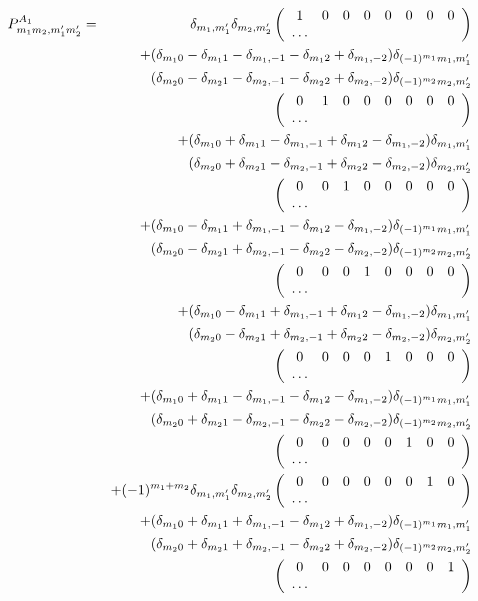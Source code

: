 \begin{eqnarray}\label{P3}
P^{A_1}_{m_1m_2,m'_1m'_2}&=&\delta_{m_1,m'_1}\delta_{m_2,m'_2}
\left (
\begin{array}{ccccccccc}
1 & 0 & 0 & 0 & 0 & 0 & 0 & 0\\
\dots 
\end{array} \right )\\ \nonumber
&&+(\delta_{m_10}-\delta_{m_11}-\delta_{m_1,-1}-\delta_{m_12}+\delta_{m_1,-2})
\delta_{(-1)^{m_1}m_1,m'_1}\\ \nonumber
&&(\delta_{m_20}-\delta_{m_21}-\delta_{m_2,-1}-\delta_{m_22}+\delta_{m_2,-2})
\delta_{(-1)^{m_2}m_2,m'_2}\\ \nonumber
&&\left (
\begin{array}{ccccccccc}
0 & 1 & 0 & 0 & 0 & 0 & 0 & 0\\
\dots
\end{array} \right )\\ \nonumber
&&+(\delta_{m_10}+\delta_{m_11}-\delta_{m_1,-1}+\delta_{m_12}-\delta_{m_1,-2})
\delta_{m_1,m'_1}\\ \nonumber
&&(\delta_{m_20}+\delta_{m_21}-\delta_{m_2,-1}+\delta_{m_22}-\delta_{m_2,-2})
\delta_{m_2,m'_2}\\ \nonumber
&&\left (
\begin{array}{ccccccccc}
0 & 0 & 1 & 0 & 0 & 0 & 0 & 0\\
\dots 
\end{array} \right )\\ \nonumber
&&+(\delta_{m_10}-\delta_{m_11}+\delta_{m_1,-1}-\delta_{m_12}-\delta_{m_1,-2})
\delta_{(-1)^{m_1}m_1,m'_1} \\ \nonumber
&&
(\delta_{m_20}-\delta_{m_21}+\delta_{m_2,-1}-\delta_{m_22}-\delta_{m_2,-2})
\delta_{(-1)^{m_2}m_2,m'_2} \\ \nonumber
&&\left (
\begin{array}{ccccccccc}
0 & 0 & 0 & 1 & 0 & 0 & 0 & 0\\
\dots 
\end{array} \right ) \\ \nonumber
&&+(\delta_{m_10}-\delta_{m_11}+\delta_{m_1,-1}+\delta_{m_12}-\delta_{m_1,-2})
\delta_{m_1,m'_1}\\ \nonumber
&&(\delta_{m_20}-\delta_{m_21}+\delta_{m_2,-1}+\delta_{m_22}-\delta_{m_2,-2})
\delta_{m_2,m'_2}\\ \nonumber
&&\left (
\begin{array}{ccccccccc}
0 & 0 & 0 & 0 & 1 & 0 & 0 & 0\\
\dots 
\end{array} \right )\\ \nonumber
&&+(\delta_{m_10}+\delta_{m_11}-\delta_{m_1,-1}-\delta_{m_12}-\delta_{m_1,-2})
\delta_{(-1)^{m_1}m_1,m'_1} \\ \nonumber
&&
(\delta_{m_20}+\delta_{m_21}-\delta_{m_2,-1}-\delta_{m_22}-\delta_{m_2,-2})
\delta_{(-1)^{m_2}m_2,m'_2} \\ \nonumber
&&\left (
\begin{array}{ccccccccc}
0 & 0 & 0 & 0 & 0 & 1 & 0 & 0\\
\dots 
\end{array} \right )\\ \nonumber
&&+(-1)^{m_1+m_2}\delta_{m_1,m'_1}\delta_{m_2,m'_2}
\left (
\begin{array}{ccccccccc}
0 & 0 & 0 & 0 & 0 & 0 & 1 & 0\\
\dots 
\end{array} \right )\\ \nonumber
&&+(\delta_{m_10}+\delta_{m_11}+\delta_{m_1,-1}-\delta_{m_12}+\delta_{m_1,-2})
\delta_{(-1)^{m_1}m_1,m'_1}\\ \nonumber
&&(\delta_{m_20}+\delta_{m_21}+\delta_{m_2,-1}-\delta_{m_22}+\delta_{m_2,-2})
\delta_{(-1)^{m_2}m_2,m'_2}\\ \nonumber
&&\left (
\begin{array}{ccccccccc}
0 & 0 & 0 & 0 & 0 & 0 & 0 & 1\\
\dots 
\end{array} \right )
\end{eqnarray}


